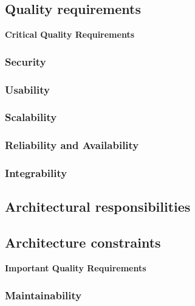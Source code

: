 \documentclass[a4paper,12pt,titlepage]{article}
\begin{document}
 	\subsection{Quality requirements}
 	
		\textbf{\LARGE Critical Quality Requirements}
		\subsubsection{Security}
			
			
		\subsubsection{Usability}
			
			
		\subsubsection{Scalability}
			
			
		\subsubsection{Reliability and Availability}
			
			
		\subsubsection{Integrability}
			
	\subsection{Architectural responsibilities}
	\subsection{Architecture constraints}	



\textbf{\LARGE Important Quality Requirements}
			
		\subsubsection{Maintainability}
			
			
\end{document}
